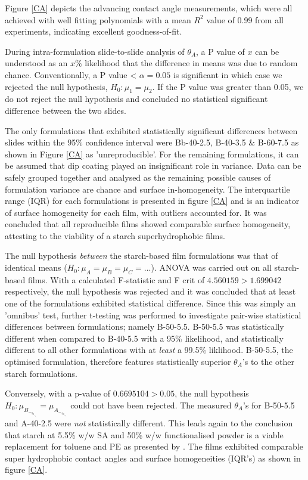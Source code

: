 Figure \ref{CA} depicts the advancing contact angle measurements, which were all achieved with well fitting polynomials with a mean $R^2$ value of 0.99 from all experiments, indicating excellent goodness-of-fit. 
\par During intra-formulation slide-to-slide analysis of $\theta_A$, a P value of $x$ can be understood as an $x\%$ likelihood that the difference in means was due to random chance. Conventionally, a P value < $\alpha = 0.05$ is significant in which case we rejected the null hypothesis, $H_0:\mu_1 = \mu_2$.  If the P value was greater than 0.05, we do not reject the null hypothesis and concluded no statistical significant difference between the two slides. 
\par The only formulations that exhibited statistically significant differences between slides within the 95\% confidence interval were Bb-40-2.5, B-40-3.5 \& B-60-7.5 as shown in Figure \ref{CA} as 'unreproducible'. For the remaining formulations, it can be assumed that dip coating played an insignificant role in variance. Data can be safely grouped together and analysed as the remaining possible causes of formulation variance are chance and surface in-homogeneity. The interquartile range (IQR) for each formulations is presented in figure \ref{CA} and is an indicator of surface homogeneity for each film, with outliers accounted for. It was concluded that all reproducible films showed comparable surface homogeneity, attesting to the viability of a starch superhydrophobic films.
\par The null hypothesis \emph{between} the starch-based film formulations was that of identical means ($H_0: \mu_A = \mu_B = \mu_C =...$). ANOVA was carried out on all starch-based films. With a calculated F-statistic and F crit of $4.560159>1.699042$ respectively, the null hypothesis was rejected and it was concluded that at least one of the formulations exhibited statistical difference. Since this was simply an 'omnibus' test, further t-testing was performed to investigate pair-wise statistical differences between formulations; namely B-50-5.5. B-50-5.5 was statistically different when compared to B-40-5.5 with a 95\% likelihood, and statistically different to all other formulations with at \emph{least} a 99.5\% liklihood. B-50-5.5, the optimised formulation, therefore features statistically superior $\theta_A$'s to the other starch formulations.
\par Conversely, with a p-value of $0.6695104>0.05$, the null hypothesis $H_0: \mu_B_-_5_0_-_5_._5 = \mu_A_-_4_0_-_2_._5$ could not have been rejected. The measured $\theta_A$'s for B-50-5.5 and A-40-2.5 were \emph{not} statistically different. This leads again to the conclusion that starch at 5.5\% w/w SA and 50\% w/w functionalised powder is a viable replacement for toluene and PE as presented by \cite{khoo_lim_2017}. The films exhibited comparable super hydrophobic contact angles and surface homogeneities (IQR's) as shown in figure \ref{CA}.



